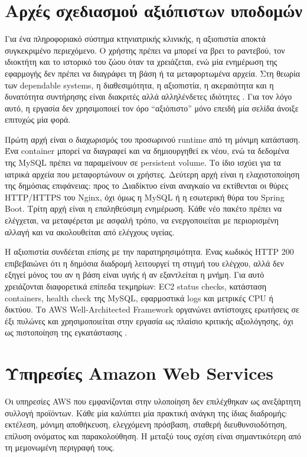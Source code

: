 \section{Αρχές σχεδιασμού αξιόπιστων υποδομών}

Για ένα πληροφοριακό σύστημα κτηνιατρικής κλινικής, η αξιοπιστία αποκτά
συγκεκριμένο περιεχόμενο. Ο χρήστης πρέπει να μπορεί να βρει το ραντεβού, τον
ιδιοκτήτη και το ιστορικό του ζώου όταν τα χρειάζεται, ενώ μία ενημέρωση της
εφαρμογής δεν πρέπει να διαγράφει τη βάση ή τα μεταφορτωμένα αρχεία. Στη
θεωρία των dependable systems, η διαθεσιμότητα, η αξιοπιστία, η ακεραιότητα
και η δυνατότητα συντήρησης είναι διακριτές αλλά αλληλένδετες ιδιότητες
\cite{avizienis2004dependability}. Για τον λόγο αυτό, η εργασία δεν χρησιμοποιεί
τον όρο ``αξιόπιστο'' μόνο επειδή μία σελίδα άνοιξε επιτυχώς μία φορά.

Πρώτη αρχή είναι ο διαχωρισμός του προσωρινού runtime από τη μόνιμη
κατάσταση. Ένα container μπορεί να διαγραφεί και να δημιουργηθεί εκ νέου,
ενώ τα δεδομένα της MySQL πρέπει να παραμείνουν σε persistent volume. Το ίδιο
ισχύει για τα ιατρικά αρχεία που μεταφορτώνουν οι χρήστες. Δεύτερη αρχή είναι
η ελαχιστοποίηση της δημόσιας επιφάνειας: προς το Διαδίκτυο είναι αναγκαίο να
εκτίθενται οι θύρες HTTP/HTTPS του Nginx, όχι όμως η MySQL ή η εσωτερική θύρα
του Spring Boot. Τρίτη αρχή είναι η επαληθεύσιμη ενημέρωση. Κάθε νέο πακέτο
πρέπει να ελέγχεται, να μεταφέρεται με ασφαλή τρόπο, να ενεργοποιείται με
περιορισμένη αλλαγή και να ακολουθείται από ελέγχους υγείας.

Η αξιοπιστία συνδέεται επίσης με την παρατηρησιμότητα. Ένας κωδικός HTTP 200
επιβεβαιώνει ότι η δημόσια διαδρομή λειτουργεί τη στιγμή του ελέγχου, αλλά
δεν εξηγεί μόνος του αν η βάση είναι υγιής ή αν εξαντλείται η μνήμη. Για αυτό
χρειάζονται διαφορετικά επίπεδα τεκμηρίων: EC2 status checks, κατάσταση
containers, health check της MySQL, εφαρμοστικά logs και μετρικές CPU ή
δικτύου. Το AWS Well-Architected Framework οργανώνει αντίστοιχες ερωτήσεις
σε έξι πυλώνες και χρησιμοποιείται στην εργασία ως πλαίσιο κριτικής
αξιολόγησης, όχι ως πιστοποίηση της εγκατάστασης
\cite{aws2024wellarchitected}.

\section{Υπηρεσίες Amazon Web Services}

Οι υπηρεσίες AWS που εμφανίζονται στην υλοποίηση δεν επιλέχθηκαν ως
ανεξάρτητη συλλογή προϊόντων. Κάθε μία καλύπτει μία πρακτική ανάγκη της ίδιας
διαδρομής: εκτέλεση, μόνιμη αποθήκευση, ελεγχόμενη πρόσβαση, σταθερή
διευθυνσιοδότηση, επίλυση ονόματος και παρακολούθηση. Η μεταξύ τους σχέση
είναι σημαντικότερη από τη μεμονωμένη περιγραφή τους.

